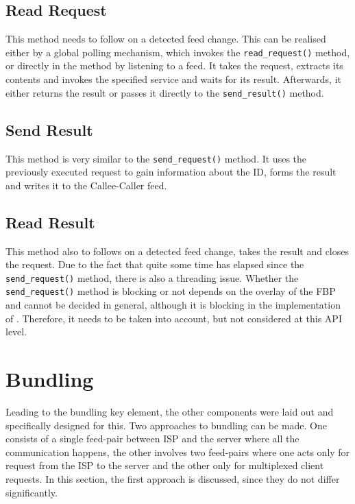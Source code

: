 \subsection{Read Request}
This method needs to follow on a detected feed change. This can be realised either by a global polling mechanism, which invokes the \lstinline{read_request()} method, or directly in the method by listening to a feed. It takes the request, extracts its contents and invokes the specified service and waits for its result. Afterwards, it either returns the result or passes it directly to the \lstinline{send_result()} method. 
\begin{python}
    
    
\end{python}


\subsection{Send Result}
This method is very similar to the \lstinline{send_request()} method. It uses the previously executed request to gain information about the ID, forms the result and writes it to the Callee-Caller feed.
\begin{python}

    
\end{python}

\subsection{Read Result}
This method also to follows on a detected feed change, takes the result and closes the request. Due to the fact that quite some time has elapsed since the \lstinline{send_request()} method, there is also a threading issue. Whether the \lstinline{send_request()} method is blocking or not depends on the overlay of the FBP and cannot be decided in general, although it is blocking in the implementation of \citet{birrell1984implementing}. Therefore, it needs to be taken into account, but not considered at this API level.
\begin{python}

    
\end{python}


\section{Bundling}
Leading to the bundling key element, the other components were laid out and specifically designed for this. Two approaches to bundling can be made. One consists of a single feed-pair between ISP and the server where all the communication happens, the other involves two feed-pairs where one acts only for request from the ISP to the server and the other only for multiplexed client requests. In this section, the first approach is discussed, since they do not differ significantly.

